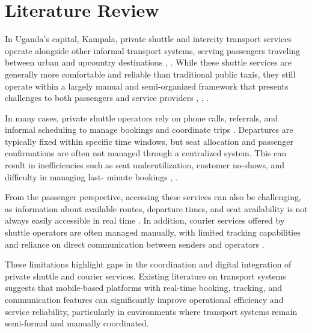 
\chapter{Literature Review}
\label{chap:literature_review}
In Uganda’s capital, Kampala, private shuttle and intercity transport services
operate alongside other informal transport systems, serving passengers traveling
between urban and upcountry destinations \cite{ndibatya2020kampala},
\cite{courtright2021uganda}. While these shuttle services are generally more
comfortable and reliable than traditional public taxis, they still operate
within a largely manual and semi-organized framework that presents challenges to
both passengers and service providers \cite{howwemadeit2023ugandaTransport},
\cite{manwaring2021informal}, \cite{entebbe2026privateTransfers}.


In many cases, private shuttle operators rely on phone calls, referrals, and
informal scheduling to manage bookings and coordinate trips
\cite{howwemadeit2023ugandaTransport}. Departures are typically fixed within
specific time windows, but seat allocation and passenger confirmations are often
not managed through a centralized system. This can result in inefficiencies such
as seat underutilization, customer no-shows, and difficulty in managing last-
minute bookings \cite{manwaring2021informal}, \cite{masinde2024uganda}.


From the passenger perspective, accessing these services can also be
challenging, as information about available routes, departure times, and seat
availability is not always easily accessible in real time
\cite{intalinc2021kampala}. In addition, courier services offered by shuttle
operators are often managed manually, with limited tracking capabilities and
reliance on direct communication between senders and operators
\cite{masinde2024uganda}.


These limitations highlight gaps in the coordination and digital integration of
private shuttle and courier services. Existing literature on transport systems
suggests that mobile-based platforms with real-time booking, tracking, and
communication features can significantly improve operational efficiency and
service reliability, particularly in environments where transport systems remain
semi-formal and manually coordinated.


